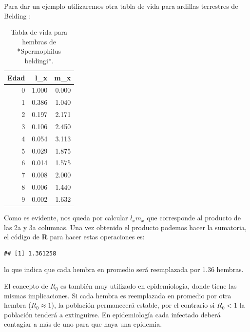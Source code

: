 \documentclass[
]{book}
\newenvironment{Shaded}{\begin{snugshade}}{\end{snugshade}}
\newcommand{\FunctionTok}[1]{\textcolor[rgb]{0.00,0.00,0.00}{#1}}
\newcommand{\NormalTok}[1]{#1}
\newcommand{\OtherTok}[1]{\textcolor[rgb]{0.56,0.35,0.01}{#1}}
\newcommand{\SpecialCharTok}[1]{\textcolor[rgb]{0.00,0.00,0.00}{#1}}
\begin{document}
Para dar un ejemplo utilizaremos otra tabla de vida para ardillas terrestres de Belding \citep{Sherman1984}:

\begin{table}

\caption{\label{tab:tabla-belding}Tabla de vida para hembras de *Spermophilus beldingi*.}
\centering
\begin{tabular}[t]{r|r|r}
\hline
Edad & l\_x & m\_x\\
\hline
0 & 1.000 & 0.000\\
\hline
1 & 0.386 & 1.040\\
\hline
2 & 0.197 & 2.171\\
\hline
3 & 0.106 & 2.450\\
\hline
4 & 0.054 & 3.113\\
\hline
5 & 0.029 & 1.875\\
\hline
6 & 0.014 & 1.575\\
\hline
7 & 0.008 & 2.000\\
\hline
8 & 0.006 & 1.440\\
\hline
9 & 0.002 & 1.632\\
\hline
\end{tabular}
\end{table}

Como es evidente, nos queda por calcular \(l_x m_x\) que corresponde al producto de las 2a y 3a columnas. Una vez obtenido el producto podemos hacer la sumatoria, el código de \textbf{R} para hacer estas operaciones es:

\begin{Shaded}
\end{Shaded}

\begin{verbatim}
## [1] 1.361258
\end{verbatim}

lo que indica que cada hembra en promedio será reemplazada por 1.36 hembras.

El concepto de \(R_0\) es también muy utilizado en epidemiología, donde tiene las mismas implicaciones. Si cada hembra es reemplazada en promedio por otra hembra (\(R_0 \approx 1\)), la población permanecerá estable, por el contrario si \(R_0 < 1\) la población tenderá a extinguirse. En epidemiología cada infectado deberá contagiar a más de uno para que haya una epidemia.
\end{document}
